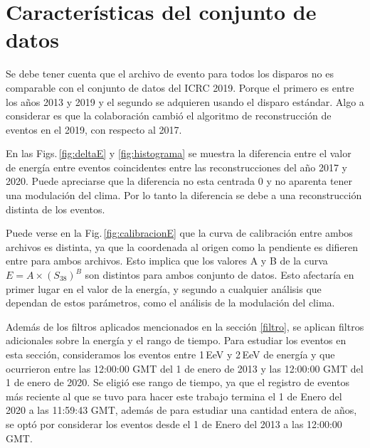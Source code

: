 	\section{Características del conjunto de datos} \label{specs}

      Se debe tener cuenta que el archivo de evento para todos los disparos no es comparable con el conjunto  de datos del ICRC 2019. Porque el primero es entre los años 2013 y 2019 y el segundo se adquieren usando el disparo estándar.  Algo a considerar es que la colaboración cambió el algoritmo de reconstrucción de eventos en el 2019, con respecto al 2017.

      En las  Figs.\,\ref{fig:deltaE} y \ref{fig:histograma} se muestra la diferencia entre el valor de energía entre eventos coincidentes entre las reconstrucciones del año 2017 y 2020. Puede apreciarse que la diferencia no esta centrada 0 y no aparenta tener una modulación del clima. Por lo tanto la diferencia se debe a una reconstrucción distinta de los eventos.



      Puede verse en la Fig.\,\ref{fig:calibracionE} que la curva de calibración entre ambos archivos es distinta, ya que la coordenada al origen como la pendiente es difieren entre para ambos archivos. Esto implica que los valores A y B de la curva $E=A\times (S_{38})^B$ son distintos para ambos conjunto de datos. Esto afectaría en primer lugar en el valor de la energía, y segundo a cualquier análisis que dependan de estos parámetros, como el análisis de la modulación del clima.


	Además de los filtros aplicados mencionados en la sección \ref{filtro}, se aplican filtros adicionales sobre la energía y el rango de tiempo. Para estudiar los eventos en esta sección, consideramos los eventos entre 1\,EeV y 2\,EeV de energía y que ocurrieron entre las 12:00:00 GMT del 1 de enero de 2013 y las 12:00:00 GMT del 1 de enero de 2020. Se  eligió ese rango de tiempo, ya que el registro de eventos más reciente al que se tuvo para hacer este trabajo termina el 1 de Enero del 2020  a las 11:59:43 GMT, además de para estudiar una cantidad entera de años, se optó por considerar los eventos desde el 1 de Enero del 2013 a las 12:00:00 GMT.

